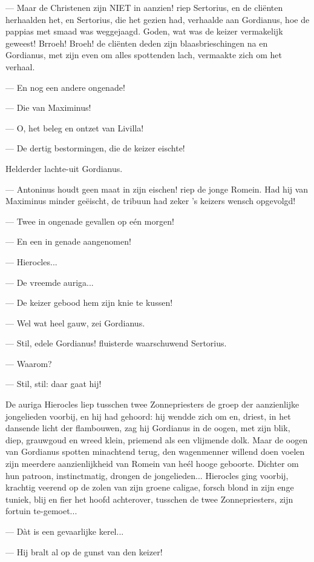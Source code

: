 \documentclass[a4paper, 12pt, oneside, dutch]{article}
\begin{document}
--- Maar de Christenen zijn NIET in aanzien! riep Sertorius, en de cliënten herhaalden het, en Sertorius, die het gezien had, verhaalde aan Gordianus, hoe de pappias met smaad was weggejaagd. Goden, wat was de keizer vermakelijk geweest! Brroeh! Broeh! de cliënten deden zijn blaasbrieschingen na en Gordianus, met zijn even om alles spottenden lach, vermaakte zich om het verhaal.

--- En nog een andere ongenade!

--- Die van Maximinus!

--- O, het beleg en ontzet van Livilla!

--- De dertig bestormingen, die de keizer eischte!

Helderder lachte-uit Gordianus.

--- Antoninus houdt geen maat in zijn eischen! riep de jonge Romein. Had hij van Maximinus minder geëischt, de tribuun had zeker 's keizers wensch opgevolgd!

--- Twee in ongenade gevallen op eén morgen!

--- En een in genade aangenomen!

--- Hierocles...

--- De vreemde auriga...

--- De keizer gebood hem zijn knie te kussen!

--- Wel wat heel gauw, zei Gordianus.

--- Stil, edele Gordianus! fluisterde waarschuwend Sertorius.

--- Waarom?

--- Stil, stil: daar gaat hij!

De auriga Hierocles liep tusschen twee Zonnepriesters de groep der aanzienlijke jongelieden voorbij, en hij had gehoord: hij wendde zich om en, driest, in het dansende licht der flambouwen, zag hij Gordianus in de oogen, met zijn blik, diep, grauwgoud en wreed klein, priemend als een vlijmende dolk. Maar de oogen van Gordianus spotten minachtend terug, den wagenmenner willend doen voelen zijn meerdere aanzienlijkheid van Romein van heél hooge geboorte. Dichter om hun patroon, instinctmatig, drongen de jongelieden... Hierocles ging voorbij, krachtig veerend op de zolen van zijn groene caligae, forsch blond in zijn enge tuniek, blij en fier het hoofd achterover, tusschen de twee Zonnepriesters, zijn fortuin te-gemoet...

--- Dàt is een gevaarlijke kerel...

--- Hij bralt al op de gunst van den keizer!
\end{document}
